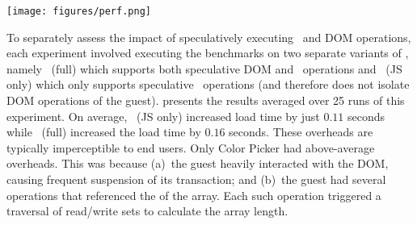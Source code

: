\begin{figure*}[t]
\setlength{\tabcolsep}{2pt}
\centering
\texttt{[image: figures/perf.png]}
{\label{figure:onloadperf}}
\end{figure*}


To separately assess the impact of speculatively executing \js\ and DOM
operations, each experiment involved executing the benchmarks on two separate
variants of \txjs, namely \txjs\ (full) which supports both speculative DOM and
\js\ operations and \txjs\ (JS only) which only supports speculative \js\
operations (and therefore does not isolate DOM operations of the guest).
\figref{figure:onloadperf} presents the results averaged over 25 runs
of this experiment. On average, \txjs\ (JS only) increased load time by just
$0.11$ seconds while \txjs\ (full) increased the load time by $0.16$ seconds.
These overheads are typically imperceptible to end users. Only Color Picker
had above-average overheads. This was because (a)~the guest heavily
interacted with the DOM, causing frequent suspension of its transaction; and
(b)~the guest had several \code{Array} operations that referenced the
\code{length} of the array. Each such operation triggered a traversal of
read/write sets to calculate the array length.

